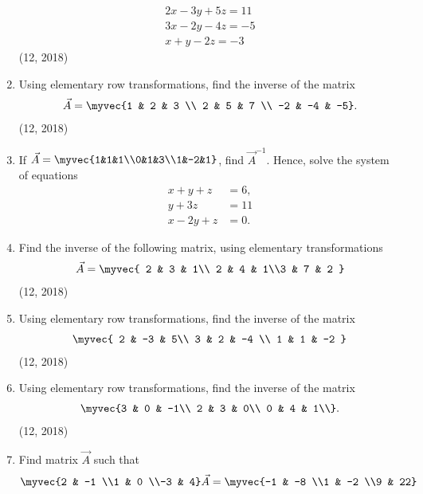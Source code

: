 \begin{enumerate}[label=\thesubsection.\arabic*,ref=\thesubsection.\theenumi]
	\begin{align*}
		2x-3y+5z=11 \\
		3x-2y-4z=-5\\
		x+y-2z=-3
	\end{align*}
\hfill (12, 2018)
\item Using elementary row transformations, find the inverse of the matrix 
\begin{align*}
	\vec{A}=\myvec{1 & 2 & 3 \\ 2 & 5 & 7 \\ -2 & -4 & -5}.
\end{align*}
\hfill (12, 2018)
\item If $ {\vec{A}} = \myvec{1&1&1\\0&1&3\\1&-2&1}$, find $\vec{A}^{-1}$.
Hence, solve the system of equations 
\begin{align*}
    x+y+z&=6 ,\\
    y+3z&=11 \\
    x-2y+z&= 0.
\end{align*}
\item Find the inverse of the following matrix, using elementary transformations
 \begin{align*}
 \vec{A}=\myvec{ 2 & 3 & 1\\ 2 & 4 & 1\\3 & 7 & 2 }
 \end{align*}
\hfill (12, 2018)
\item Using elementary row transformations, find the inverse of the matrix 
\begin{align*}
\myvec{
    2 & -3 & 5\\
    3 & 2 & -4 \\
    1 & 1 & -2
}
\end{align*}
\hfill (12, 2018)
\item Using elementary row transformations, find the inverse of the matrix 
\begin{align*}
	\myvec{3 & 0 & -1\\
	2 & 3 & 0\\
	0 & 4 & 1\\}.
\end{align*}
\hfill (12, 2018)
\item Find matrix $\vec{A}$ such that
\begin{align*}
   \myvec{2 & -1 \\1 & 0 \\-3 & 4} \vec{A}=\myvec{-1 & -8 \\1 & -2 \\9 & 22} 

\end{align*}
\end{enumerate}
